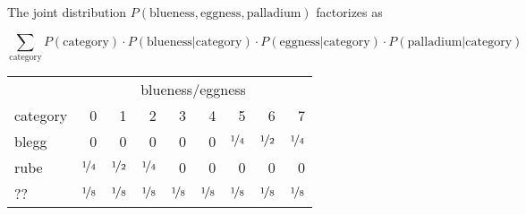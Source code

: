 \documentclass{article}
\begin{document}
\renewcommand{\arraystretch}{1.2}

The joint distribution $P(\mathrm{blueness}, \mathrm{eggness}, \mathrm{palladium})$ factorizes as

$$\sum_{\mathrm{category}} P(\mathrm{category}) \cdot P(\mathrm{blueness}|\mathrm{category}) \cdot P(\mathrm{eggness}|\mathrm{category}) \cdot P(\mathrm{palladium}|\mathrm{category})$$


\begin{table}[h!]
  \begin{tabular}{l|r|r|r|r|r|r|r|r|}
    & \multicolumn{8}{c}{blueness/eggness} \\
    category & 0 & 1 & 2 & 3 & 4 & 5 & 6 & 7 \\ \hline
    blegg & 0 & 0 & 0 & 0 & 0 & $\nicefrac{1}{4}$ & $\nicefrac{1}{2}$ & $\nicefrac{1}{4}$ \\ \hline
    rube & $\nicefrac{1}{4}$ & $\nicefrac{1}{2}$ & $\nicefrac{1}{4}$ & 0 & 0 & 0 & 0 & 0 \\ \hline
    ?? & $\nicefrac{1}{8}$ & $\nicefrac{1}{8}$ & $\nicefrac{1}{8}$ & $\nicefrac{1}{8}$ & $\nicefrac{1}{8}$ & $\nicefrac{1}{8}$ & $\nicefrac{1}{8}$ & $\nicefrac{1}{8}$ \\ \hline
  \end{tabular}
\end{table}
\end{document}
